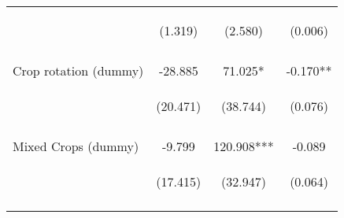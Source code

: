 \begin{center}
\begin{tabular}{lccc}
 & \begin{footnotesize}(1.319)\end{footnotesize} & \begin{footnotesize}(2.580)\end{footnotesize} & \begin{footnotesize}(0.006)\end{footnotesize} \\
\vspace{4pt} & \begin{footnotesize}[0.009]\end{footnotesize} & \begin{footnotesize}[0.710]\end{footnotesize} & \begin{footnotesize}[0.001]\end{footnotesize} \\
Crop rotation (dummy) & -28.885 & 71.025* & -0.170** \\
 & \begin{footnotesize}(20.471)\end{footnotesize} & \begin{footnotesize}(38.744)\end{footnotesize} & \begin{footnotesize}(0.076)\end{footnotesize} \\
\vspace{4pt} & \begin{footnotesize}[0.158]\end{footnotesize} & \begin{footnotesize}[0.067]\end{footnotesize} & \begin{footnotesize}[0.025]\end{footnotesize} \\
Mixed Crops (dummy) & -9.799 & 120.908*** & -0.089 \\
 & \begin{footnotesize}(17.415)\end{footnotesize} & \begin{footnotesize}(32.947)\end{footnotesize} & \begin{footnotesize}(0.064)\end{footnotesize} \\
\vspace{4pt} & \begin{footnotesize}[0.574]\end{footnotesize} & \begin{footnotesize}[0.000]\end{footnotesize} & \begin{footnotesize}[0.170]\end{footnotesize} \\

\end{tabular}
\end{center}
